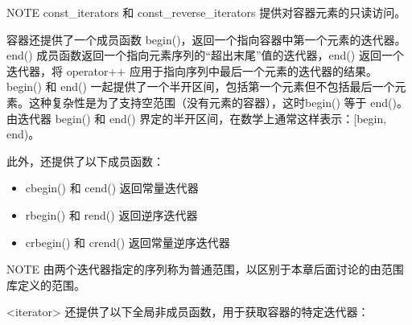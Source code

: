 \begin{myNotic}{NOTE}
const\_iterators 和 const\_reverse\_iterators 提供对容器元素的只读访问。
\end{myNotic}

容器还提供了一个成员函数 begin()，返回一个指向容器中第一个元素的迭代器。end() 成员函数返回一个指向元素序列的“超出末尾”值的迭代器，end() 返回一个迭代器，将 operator++ 应用于指向序列中最后一个元素的迭代器的结果。begin() 和 end() 一起提供了一个半开区间，包括第一个元素但不包括最后一个元素。这种复杂性是为了支持空范围（没有元素的容器），这时begin() 等于 end()。由迭代器 begin() 和 end() 界定的半开区间，在数学上通常这样表示：[begin, end)。

此外，还提供了以下成员函数：

\begin{itemize}
\item
cbegin() 和 cend() 返回常量迭代器

\item
rbegin() 和 rend() 返回逆序迭代器

\item
crbegin() 和 crend() 返回常量逆序迭代器
\end{itemize}

\begin{myNotic}{NOTE}
由两个迭代器指定的序列称为普通范围，以区别于本章后面讨论的由范围库定义的范围。
\end{myNotic}

<iterator> 还提供了以下全局非成员函数，用于获取容器的特定迭代器：

